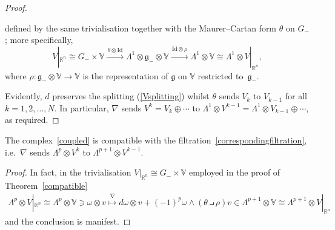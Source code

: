 \begin{proof}
\begin{itemize}
def\/ined by the same trivialisation together with the Maurer--Cartan form
$\theta$ on $G_-$; more specif\/ically,
\[V|_{{\mathbb{R}}^n}\cong
G_-\times{\mathbb{V}}\xrightarrow{\,\theta\otimes{\mathrm{Id}}\,}
\Lambda^1\otimes{\mathfrak{g}}_-\otimes{\mathbb{V}}
\xrightarrow{\,{\mathrm{Id}}\otimes\rho\,}\Lambda^1\otimes{\mathbb{V}}\cong
\Lambda^1\otimes V|_{{\mathbb{R}}^n},\]
where $\rho:{\mathfrak{g}}_-\otimes{\mathbb{V}}\to{\mathbb{V}}$ is the
representation of ${\mathfrak{g}}$ on ${\mathbb{V}}$ restricted
to~${\mathfrak{g}}_-$.
\end{itemize}
Evidently, $d$ preserves the splitting (\ref{Vsplitting}) whilst $\theta$
sends $V_k$ to $V_{k-1}$ for all $k=1,2,\ldots, N$. In particular, $\nabla$
sends $V^k=V_k\oplus\cdots$ to
$\Lambda^1\otimes V^{k-1}=\Lambda^1\otimes V_{k-1}\oplus\cdots$, as required.
\end{proof}

\begin{corollary}\label{easypeasy}
The complex~\eqref{coupled} is compatible with the
filtration~\eqref{correspondingfiltration}, i.e.~$\nabla$ sends
$\Lambda^p\otimes V^k$ to $\Lambda^{p+1}\otimes V^{k-1}$.
\end{corollary}

\begin{proof} In fact, in the trivialisation $V|_{{\mathbb{R}}^n}\cong
G_-\times{\mathbb{V}}$ employed in the proof of Theorem~\ref{compatible}
\begin{gather*}
\Lambda^p\otimes V|_{{\mathbb{R}}^n}\cong\Lambda^p\otimes{\mathbb{V}}\ni
\omega\otimes v\stackrel{\nabla}{\longmapsto}
d\omega\otimes v+(-1)^p\omega\wedge(\theta\intprod\rho)v\in
\Lambda^{p+1}\otimes{\mathbb{V}}\cong\Lambda^{p+1}\otimes V|_{{\mathbb{R}}^n}
\end{gather*}
and the conclusion is manifest.\end{proof}

